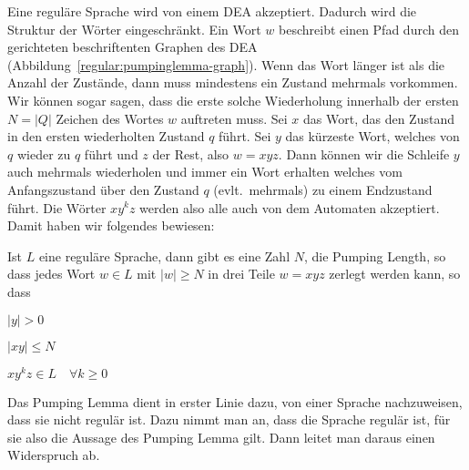 Eine reguläre Sprache wird von einem DEA akzeptiert.
Dadurch wird die Struktur der Wörter eingeschränkt.
Ein Wort $w$ beschreibt
einen Pfad durch den gerichteten beschriftenten Graphen des DEA
(Abbildung~\ref{regular:pumpinglemma-graph}).
Wenn das Wort länger ist als die Anzahl der Zustände, dann muss
mindestens ein Zustand mehrmals vorkommen.
Wir können sogar
sagen, dass die erste solche Wiederholung innerhalb der ersten
$N = |Q|$ Zeichen des Wortes $w$ auftreten muss.
Sei $x$ das Wort,
das den Zustand in den ersten wiederholten Zustand $q$ führt.
Sei $y$ das kürzeste Wort, welches von $q$ wieder zu $q$ führt und
$z$ der Rest, also $w=xyz$.
Dann können wir die Schleife $y$
auch mehrmals wiederholen und immer ein Wort erhalten welches
vom Anfangszustand über den Zustand $q$ (evlt.~mehrmals) zu einem
Endzustand führt.
Die Wörter $xy^kz$ werden also alle auch von dem Automaten akzeptiert.
Damit haben wir folgendes bewiesen:
\begin{satz}
%
Ist $L$ eine reguläre Sprache, dann gibt es eine Zahl $N$, die Pumping Length, so dass
jedes Wort $w\in L$ mit $|w|\ge N$ in drei Teile
$w=xyz$ zerlegt werden kann, so dass
\begin{compactenum}
\item $|y| > 0$
\item $|xy|\le N$
\item $xy^kz\in L\quad\forall k\ge 0$
\end{compactenum}
\end{satz}

Das Pumping Lemma dient in erster Linie dazu, von einer Sprache
nachzuweisen, dass sie nicht regulär ist.
Dazu nimmt man an, dass die Sprache regulär ist, für sie also die Aussage
des Pumping Lemma gilt.
Dann leitet man daraus einen Widerspruch ab.


